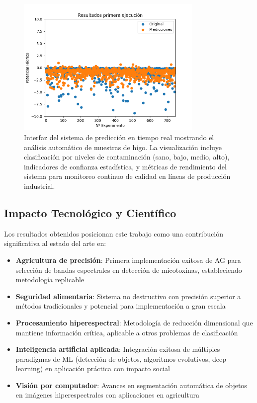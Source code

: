\begin{figure}[!ht]
\centering
\includegraphics[width=0.8\textwidth]{images/Prediccion.png}
\caption{Interfaz del sistema de predicción en tiempo real mostrando el análisis automático de muestras de higo. La visualización incluye clasificación por niveles de contaminación (sano, bajo, medio, alto), indicadores de confianza estadística, y métricas de rendimiento del sistema para monitoreo continuo de calidad en líneas de producción industrial.}
\label{fig:sistema_prediccion_industrial}
\end{figure}

\subsection{Impacto Tecnológico y Científico}

Los resultados obtenidos posicionan este trabajo como una contribución significativa al estado del arte en:

\begin{itemize}
    \item \textbf{Agricultura de precisión}: Primera implementación exitosa de AG para selección de bandas espectrales en detección de micotoxinas, estableciendo metodología replicable
    
    \item \textbf{Seguridad alimentaria}: Sistema no destructivo con precisión superior a métodos tradicionales y potencial para implementación a gran escala
    
    \item \textbf{Procesamiento hiperespectral}: Metodología de reducción dimensional que mantiene información crítica, aplicable a otros problemas de clasificación
    
    \item \textbf{Inteligencia artificial aplicada}: Integración exitosa de múltiples paradigmas de ML (detección de objetos, algoritmos evolutivos, deep learning) en aplicación práctica con impacto social
    
    \item \textbf{Visión por computador}: Avances en segmentación automática de objetos en imágenes hiperespectrales con aplicaciones en agricultura
\end{itemize}

